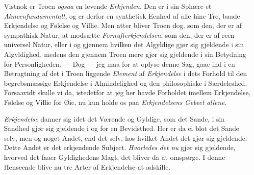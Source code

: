 \documentclass[12pt,a4paper]{book}
\newcommand{\apage}[1]{\marginnote{\footnotesize\textit{[#1]}}}
\begin{document}
Vistnok er Troen \emph{ogsaa} en levende \emph{Erkjenden}. Den er i \apage{99} sin Sphære et
\emph{Almeenfundamentalt}, og er derfor en synthetisk Eenhed af alle hine Tre,
baade Erkjendelse og Følelse og Villie. Men atter bliver Troen dog, som
den, der er af sympathisk Natur, at modsætte \emph{Fornufterkjendelsen}, som den,
der er af reen universel Natur, eller i og gjennem hvilken det Algyldige
gjør sig gjeldende i sin Algyldighed, medens den gjennem Troen mere gjør
sig gjeldende i sin Betydning for Personligheden. --- Dog --- jeg maa for
at oplyse denne Sag, gaae ind i en Betragtning af det i Troen liggende
\emph{Element} af \emph{Erkjendelse} i dets Forhold til den begrebsmæssige Erkjendelse i
Almindelighed og den philosophiske i Særdeleshed. Forsaavidt skulle vi da,
istedetfor at jeg her havde Forholdet imellem Erkjendelse, Følelse og
Villie for Øie, nu kun holde os paa \emph{Erkjendelsens Gebeet allene}.

\emph{Erkjendelse} danner sig idet det Værende og Gyldige, som det Sande, i sin
Sandhed gjør sig gjeldende i og for en Bevidsthed. Her er da ei blot det
Sande selv, men og noget Andet, end det selv, hos hvilket Andet det gjør
sig gjeldende. Dette Andet er det erkjendende Subject. \emph{Hvorledes det nu} gjør
sig gjeldende, hvorved det faaer Gyldighedens Magt, det bliver da at
omspørge. I denne Henseende blive nu tre Arter af Erkjendelse at adskille.
\end{document}
